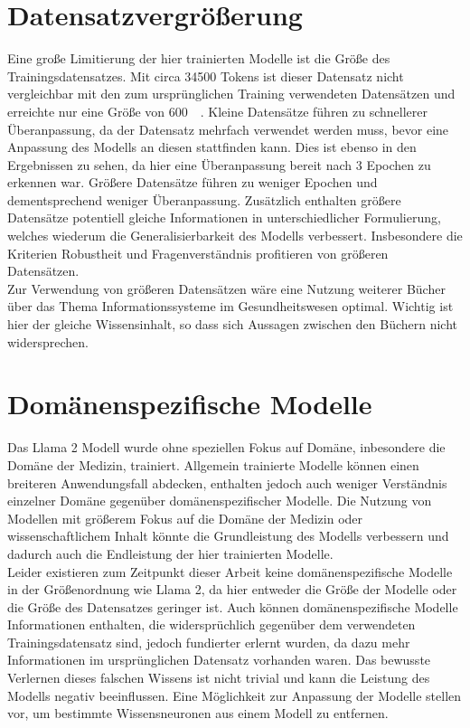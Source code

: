 \section{Datensatzvergrößerung}
Eine große Limitierung der hier trainierten Modelle ist die Größe des Trainingsdatensatzes.
Mit circa \num{34500} Tokens ist dieser Datensatz nicht vergleichbar mit den zum ursprünglichen Training verwendeten Datensätzen und erreichte nur eine Größe von \SI{600}{\kilo\byte}. Kleine Datensätze führen zu schnellerer Überanpassung, da der Datensatz mehrfach verwendet werden muss, bevor eine Anpassung des Modells an diesen stattfinden kann.
Dies ist ebenso in den Ergebnissen zu sehen, da hier eine Überanpassung bereit nach 3 Epochen zu erkennen war.
Größere Datensätze führen zu weniger Epochen und dementsprechend weniger Überanpassung.
Zusätzlich enthalten größere Datensätze potentiell gleiche Informationen in unterschiedlicher Formulierung, welches wiederum die Generalisierbarkeit des Modells verbessert.
Insbesondere die Kriterien Robustheit und Fragenverständnis profitieren von größeren Datensätzen.\\

Zur Verwendung von größeren Datensätzen wäre eine Nutzung weiterer Bücher über das Thema Informationssysteme im Gesundheitswesen optimal.
Wichtig ist hier der gleiche Wissensinhalt, so dass sich Aussagen zwischen den Büchern nicht widersprechen.

\section{Domänenspezifische Modelle}
Das Llama 2 Modell wurde ohne speziellen Fokus auf Domäne, inbesondere die Domäne der Medizin, trainiert.
Allgemein trainierte Modelle können einen breiteren Anwendungsfall abdecken, enthalten jedoch auch weniger Verständnis einzelner Domäne gegenüber domänenspezifischer Modelle.
Die Nutzung von Modellen mit größerem Fokus auf die Domäne der Medizin oder wissenschaftlichem Inhalt könnte die Grundleistung des Modells verbessern und dadurch auch die Endleistung der hier trainierten Modelle.\\

Leider existieren zum Zeitpunkt dieser Arbeit keine domänenspezifische Modelle in der Größenordnung wie Llama 2, da hier entweder die Größe der Modelle oder die Größe des Datensatzes geringer ist.
Auch können domänenspezifische Modelle Informationen enthalten, die widersprüchlich gegenüber dem verwendeten Trainingsdatensatz sind, jedoch fundierter erlernt wurden, da dazu mehr Informationen im ursprünglichen Datensatz vorhanden waren. Das bewusste Verlernen dieses falschen Wissens ist nicht trivial und kann die Leistung des Modells negativ beeinflussen.
Eine Möglichkeit zur Anpassung der Modelle stellen \citet{knowledge_neurons} vor, um bestimmte Wissensneuronen aus einem Modell zu entfernen.\\

